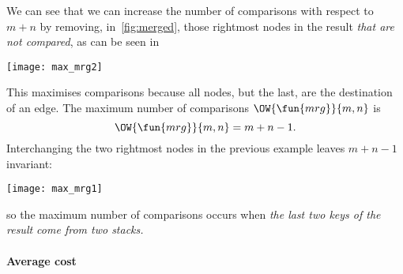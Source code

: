 We can see that we can increase the number of comparisons with respect
to \(m+n\) by removing, in~\eqref{fig:merged}, those rightmost
nodes in the result \emph{that are not compared}, as can be seen in
\begin{center}
\texttt{[image: max\_mrg2]}
\end{center}
This maximises comparisons because all nodes, but the last, are the
destination of an edge. The maximum number of comparisons
\(\OW{\fun{mrg}}{m,n}\) is
\begin{equation}
\OW{\fun{mrg}}{m,n} = m + n - 1.\label{eq:worst_merge}
\end{equation}
Interchanging the two rightmost nodes in the previous example leaves
\(m+n-1\) invariant:
\begin{center}
\texttt{[image: max\_mrg1]}
\end{center}
so the maximum number of comparisons occurs when \emph{the last two
  keys of the result come from two stacks.}


\paragraph{Average cost}

